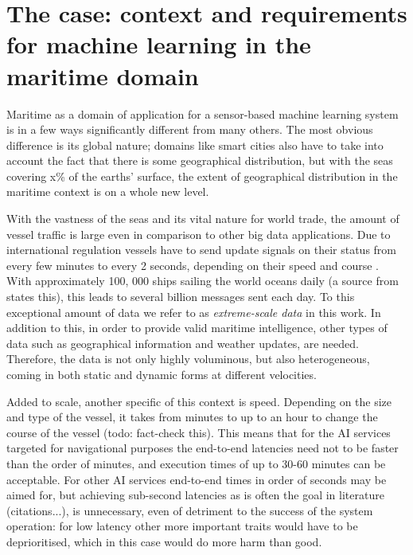 
\section{The case: context and requirements for machine learning in the maritime domain}

Maritime as a domain of application for a sensor-based machine learning system is in a few ways significantly different from many others. The most obvious difference is its global nature; domains like smart cities also have to take into account the fact that there is some geographical distribution, but with the seas covering x\% of the earths' surface, the extent of geographical distribution in the maritime context is on a whole new level.

With the vastness of the seas and its vital nature for world trade, the amount of vessel traffic is large even in comparison to other big data applications. Due to international regulation vessels have to send update signals on their status from every few minutes to every 2 seconds, depending on their speed and course \cite{maritimeinformatics}. With approximately 100, 000 ships sailing the world oceans daily (a source from \cite{maritimeinformatics} states this), this leads to several billion messages sent each day. To this exceptional amount of data we refer to as \textit{extreme-scale data} in this work. In addition to this, in order to provide valid maritime intelligence, other types of data such as geographical information and weather updates, are needed. Therefore, the data is not only highly voluminous, but also heterogeneous, coming in both static and dynamic forms at different velocities.

Added to scale, another specific of this context is speed. Depending on the size and type of the vessel, it takes from minutes to up to an hour to change the course of the vessel (todo: fact-check this). This means that for the AI services targeted for navigational purposes the end-to-end latencies need not to be faster than the order of minutes, and execution times of up to 30-60 minutes can be acceptable. For other AI services end-to-end times in order of seconds may be aimed for, but achieving sub-second latencies as is often the goal in literature (citations...), is unnecessary, even of detriment to the success of the system operation: for low latency other more important traits would have to be deprioritised, which in this case would do more harm than good.

